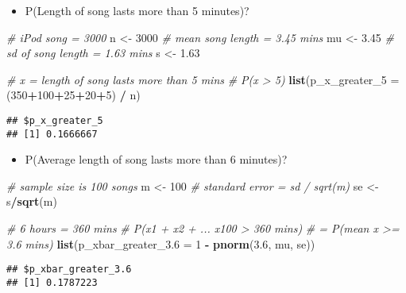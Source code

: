 \documentclass[]{book}
\newenvironment{Shaded}{\begin{snugshade}}{\end{snugshade}}
\newcommand{\CommentTok}[1]{\textcolor[rgb]{0.56,0.35,0.01}{\textit{#1}}}
\newcommand{\DataTypeTok}[1]{\textcolor[rgb]{0.13,0.29,0.53}{#1}}
\newcommand{\DecValTok}[1]{\textcolor[rgb]{0.00,0.00,0.81}{#1}}
\newcommand{\FloatTok}[1]{\textcolor[rgb]{0.00,0.00,0.81}{#1}}
\newcommand{\KeywordTok}[1]{\textcolor[rgb]{0.13,0.29,0.53}{\textbf{#1}}}
\newcommand{\NormalTok}[1]{#1}
\newcommand{\OperatorTok}[1]{\textcolor[rgb]{0.81,0.36,0.00}{\textbf{#1}}}
\newcommand{\StringTok}[1]{\textcolor[rgb]{0.31,0.60,0.02}{#1}}
\providecommand{\tightlist}{%
  \setlength{\itemsep}{0pt}\setlength{\parskip}{0pt}}
\begin{document}
\begin{itemize}
\tightlist
\item
  P(Length of song lasts more than 5 minutes)?
\end{itemize}

\begin{Shaded}
\begin{Highlighting}[]
\CommentTok{# iPod song = 3000 }
\NormalTok{n <-}\StringTok{ }\DecValTok{3000}
\CommentTok{# mean song length = 3.45 mins}
\NormalTok{mu <-}\StringTok{ }\FloatTok{3.45}
\CommentTok{# sd of song length = 1.63 mins}
\NormalTok{s <-}\StringTok{ }\FloatTok{1.63}

\CommentTok{# x = length of song lasts more than 5 mins}
\CommentTok{# P(x > 5)}
\KeywordTok{list}\NormalTok{(}\DataTypeTok{p_x_greater_5 =}\NormalTok{ (}\DecValTok{350}\OperatorTok{+}\DecValTok{100}\OperatorTok{+}\DecValTok{25}\OperatorTok{+}\DecValTok{20}\OperatorTok{+}\DecValTok{5}\NormalTok{) }\OperatorTok{/}\StringTok{ }\NormalTok{n)}
\end{Highlighting}
\end{Shaded}

\begin{verbatim}
## $p_x_greater_5
## [1] 0.1666667
\end{verbatim}

\begin{itemize}
\tightlist
\item
  P(Average length of song lasts more than 6 minutes)?
\end{itemize}

\begin{Shaded}
\begin{Highlighting}[]
\CommentTok{# sample size is 100 songs}
\NormalTok{m <-}\StringTok{ }\DecValTok{100}
\CommentTok{# standard error = sd / sqrt(m)}
\NormalTok{se <-}\StringTok{ }\NormalTok{s}\OperatorTok{/}\KeywordTok{sqrt}\NormalTok{(m)}

\CommentTok{# 6 hours = 360 mins}
\CommentTok{# P(x1 + x2 + ... x100 > 360 mins)}
\CommentTok{# = P(mean x >= 3.6 mins)}
\KeywordTok{list}\NormalTok{(}\DataTypeTok{p_xbar_greater_3.6 =} \DecValTok{1} \OperatorTok{-}\StringTok{ }\KeywordTok{pnorm}\NormalTok{(}\FloatTok{3.6}\NormalTok{, mu, se))}
\end{Highlighting}
\end{Shaded}

\begin{verbatim}
## $p_xbar_greater_3.6
## [1] 0.1787223
\end{verbatim}
\end{document}
